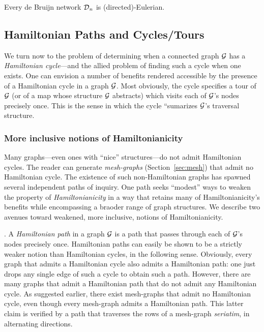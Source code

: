 \begin{corol}
\label{thm:deBruijn-Eulerian}
Every de Bruijn network $\mbox{$\cal D$}_n$ is (directed)-Eulerian.
\end{corol}


\subsection{Hamiltonian Paths and Cycles/Tours}
\label{sec:Hamiltonian-cycle}

We turn now to the problem of determining when a connected graph $\mbox{$\cal G$}$
has a {\it Hamiltonian cycle}---and the allied problem of finding such
a cycle when one exists.  One can envision a number of benefits
rendered accessible by the presence of a Hamiltonian cycle in a graph
$\mbox{$\cal G$}$.  Most obviously, the cycle specifies a tour of $\mbox{$\cal G$}$ (or of a map
whose structure $\mbox{$\cal G$}$ abstracts) which visits each of $\mbox{$\cal G$}$'s nodes
precisely once.  This is the sense in which the cycle ``sumarizes
$\mbox{$\cal G$}$'s traversal structure.

\subsubsection{More inclusive notions of Hamiltonianicity}

Many graphs---even ones with ``nice'' structures---do not admit
Hamiltonian cycles.  The reader can generate {\it mesh-graphs}
(Section~\ref{sec:mesh}) that admit no Hamiltonian cycle.  The
existence of such non-Hamiltonian graphs has spawned several
independent paths of inquiry.  One path seeks ``modest'' ways to
weaken the property of {\it Hamiltonianicity}
 in a way that retains many of
Hamiltonianicity's benefits while encompassing a braoder range of
graph structures.  We describe two avenues toward weakened, more
inclusive, notions of Hamiltonianicity.

.
A {\it Hamiltonian path} 
 in a graph $\mbox{$\cal G$}$ is a path that passes through
each of $\mbox{$\cal G$}$'s nodes precisely once.  Hamiltonian paths can easily be
shown to be a strictly weaker notion than Hamiltonian cycles, in the
following sense.  Obviously, every graph that admits a Hamiltonian
cycle also admits a Hamiltonian path: one just drops any single edge
of such a cycle to obtain such a path.  However, there are many graphs
that admit a Hamiltonian path that do not admit any Hamiltonian cycle.
As suggested earlier, there exist mesh-graphs that admit no
Hamiltonian cycle, even though every mesh-graph admits a Hamiltonian
path.  This latter claim is verified by a path that traverses the rows
of a mesh-graph {\it seriatim}, in alternating directions.

